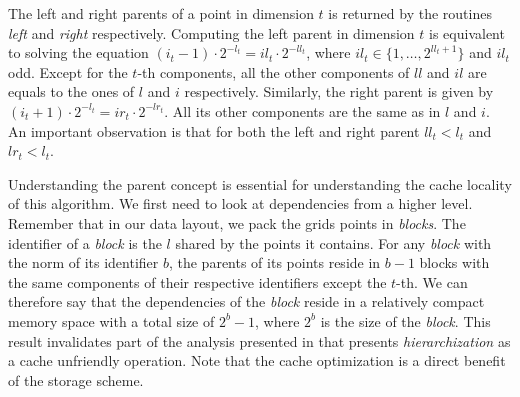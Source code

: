 The left and right parents of a point in dimension $t$ is returned by the routines \textit{left} and \textit{right} respectively. Computing the left parent in dimension $t$ is equivalent to solving the equation $(i_t - 1) \cdot 2^{-l_t} = \textit{il}_t \cdot 2^{-\textit{ll}_t}$, where $\textit{il}_t \in \{1, \dots, 2^{\textit{ll}_t+1}\}$ and $\textit{il}_t$ odd. Except for the $t$-th components, all the other components of $\textit{ll}$ and $\textit{il}$ are equals to the ones of $l$ and $i$ respectively. Similarly, the right parent is given by $(i_t + 1) \cdot 2^{-l_t} = \textit{ir}_t \cdot 2^{-\textit{lr}_t}$. All its other components are the same as in $l$ and $i$. An important observation is that for both the left and right parent $\textit{ll}_t < l_t$ and $\textit{lr}_t < l_t$. 

Understanding the parent concept is essential for understanding the cache locality of this algorithm. We first need to look at dependencies from a higher level. Remember that in our data layout, we pack the grids points in \textit{blocks}. The identifier of a \textit{block} is the $l$ shared by the points it contains. For any \textit{block} with the norm of its identifier $b$, the parents of its points reside in $b - 1$ blocks with the same components of their respective identifiers except the $t$-th. We can therefore say that the dependencies of the \textit{block} reside in a relatively compact memory space with a total size of $2^b - 1$, where $2^b$ is the size of the \textit{block}. This result invalidates part of the analysis presented in \cite{murarasu2011} that presents \textit{hierarchization} as a cache unfriendly operation. Note that the cache optimization is a direct benefit of the storage scheme.

